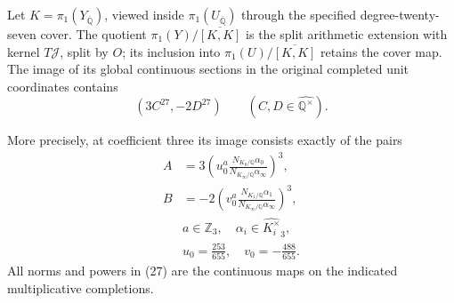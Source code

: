 \begin{proposition}
\label{prop:ghost-genjac-image}
Let \(K=\pi_1(Y_{\overline{\mathbb Q}})\), viewed
inside \(\pi_1(U_{\overline{\mathbb Q}})\) through
the specified degree-twenty-seven cover. The quotient
\(\pi_1(Y)/\overline{[K,K]}\) is the split
arithmetic extension with kernel \(T\mathcal J\),
split by \(O\); its inclusion into
\(\pi_1(U)/\overline{[K,K]}\) retains the cover
map. The image of its global continuous sections in
the original completed unit coordinates contains
\[
           (3C^{27},-2D^{27})
       \qquad(C,D\in\widehat{\mathbb Q^\times}).       \tag{26}
\]

More precisely, at coefficient three its image consists
exactly of the pairs
\[
 \begin{split}
 A&=3\left(u_0^a\frac{N_{K_0/\mathbb Q}\alpha_0}
                           {N_{K_\infty/\mathbb Q}\alpha_\infty}
      \right)^3,\\
 B&=-2\left(v_0^a\frac{N_{K_1/\mathbb Q}\alpha_1}
                            {N_{K_\infty/\mathbb Q}\alpha_\infty}
      \right)^3,                                      \tag{27}\\
 &a\in\mathbb Z_3,\quad
 \alpha_i\in\widehat{K_i^\times}_3,\\
 &u_0=\frac{253}{655},\quad v_0=-\frac{488}{655}.
 \end{split}
\]
All norms and powers in (27) are the continuous maps
on the indicated multiplicative completions.
\end{proposition}
